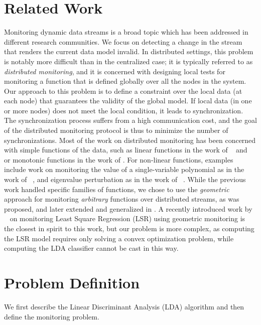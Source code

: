\section{Related Work}
Monitoring dynamic data streams is a broad topic which has been addressed in different research communities. We focus on detecting a change in the stream that renders the current data model invalid. 
In distributed settings, this problem is notably more difficult than in the centralized case; it is typically referred to as \textit{distributed monitoring}, and it is concerned with designing local tests for monitoring a function that is defined globally over all the nodes in the system.
Our approach to this problem is to define a constraint over the local data (at each node) that guarantees the validity of the global model. If local data (in one or more nodes) does not meet the local condition, it leads to synchronization. The synchronization process suffers from a high communication cost, and the goal of the distributed monitoring protocol is thus to minimize the number of synchronizations. Most of the work on distributed monitoring has been concerned with simple functions of the data, such as linear functions in the work of ~\cite{keralapura2006communication} and ~\cite{kashyap2008efficient} or monotonic functions in the work of \cite{michel2005klee}.
For non-linear functions, examples include work on monitoring the value
of a single-variable polynomial as in the work of ~\cite{shah2008handling},
and eigenvalue perturbation as in the work of ~\cite{huang2007communication}.
While the previous work handled specific families of functions, we chose to use the \textit{geometric} approach for monitoring \textit{arbitrary} functions over distributed streams, as was proposed, and later extended and generalized in \cite{sharfman2007geometric, keren2014geometric, keren2012shape}. A recently introduced work by ~\cite{gabel2015monitoring} on monitoring Least Square Regression (LSR) using geometric monitoring is the closest in spirit to this work, but our problem is more complex, as
computing the LSR model requires only solving a convex optimization problem, while
computing the LDA classifier cannot be cast in this way.

\section{Problem Definition}
We first describe the Linear Discriminant Analysis (LDA) algorithm and then define the monitoring problem. 

